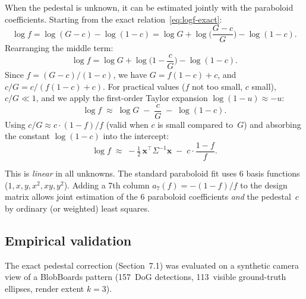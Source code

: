 \documentclass[11pt]{article}
\begin{document}
When the pedestal is unknown, it can be estimated jointly with the
paraboloid coefficients.  Starting from the exact
relation~\eqref{eq:logf-exact}:
\begin{equation}
  \log f = \log(G - c) - \log(1-c)
    = \log G + \log\!\biggl(\frac{G - c}{G}\biggr) - \log(1-c).
\end{equation}
Rearranging the middle term:
\begin{equation}
  \log f = \log G + \log\!\biggl(1 - \frac{c}{G}\biggr) - \log(1-c).
\end{equation}
Since $f = (G - c)/(1-c)$, we have $G = f(1-c) + c$, and
$c/G = c / (f(1-c) + c)$.  For practical values ($f$ not too small,
$c$ small), $c/G \ll 1$, and we apply the first-order Taylor expansion
$\log(1 - u) \approx -u$:
\begin{equation}
  \log f \;\approx\; \log G \;-\; \frac{c}{G} \;-\; \log(1-c).
  \label{eq:taylor-approx}
\end{equation}
Using $c/G \approx c \cdot (1-f)/f$ (valid when $c$ is small compared
to~$G$) and absorbing the constant $\log(1-c)$ into the intercept:
\begin{equation}
  \boxed{\log f \;\approx\; -\tfrac{1}{2}\,\mathbf{x}^\top \Sigma^{-1}\mathbf{x}
    \;-\; c \cdot \frac{1 - f}{f}.}
  \label{eq:linearized}
\end{equation}

This is \emph{linear} in all unknowns.  The standard paraboloid fit uses
6 basis functions ($1, x, y, x^2, xy, y^2$).  Adding a 7th column
$a_7(f) = -(1-f)/f$ to the design matrix allows joint estimation of the
6 paraboloid coefficients \emph{and} the pedestal~$c$ by ordinary (or
weighted) least squares.

\subsection{Empirical validation}

The exact pedestal correction (Section~7.1) was evaluated on a
synthetic camera view of a BlobBoards pattern (157~DoG detections,
113~visible ground-truth ellipses, render extent $k = 3$).
\end{document}
